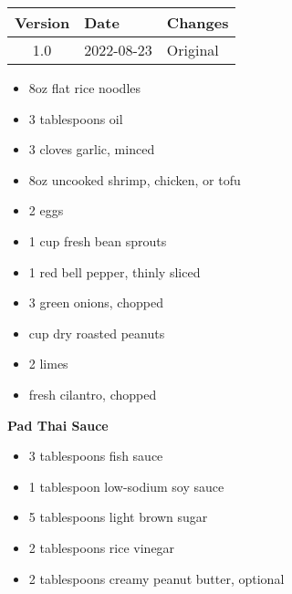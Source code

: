 \vfill

\begin{tabular}{ c | l | l }
  \textbf{Version} & \textbf{Date} & \textbf{Changes} \\ 
  \hline		
  1.0 & 2022-08-23 & Original \\
\end{tabular}



\ingredients
\begin{multicols}{2}
\raggedcolumns 
\begin{itemize}
    \item 8oz flat rice noodles
    \item 3 tablespoons oil
    \item 3 cloves garlic, minced
    \item 8oz uncooked shrimp, chicken, or tofu
    \item 2 eggs
    \item 1 cup fresh bean sprouts
    \item 1 red bell pepper, thinly sliced
    \item 3 green onions, chopped
\columnbreak
    \item {} cup dry roasted peanuts
    \item 2 limes
    \item {} fresh cilantro, chopped
\end{itemize}


\textbf{Pad Thai Sauce}
\begin{itemize}
    \item 3 tablespoons fish sauce
    \item 1 tablespoon low-sodium soy sauce
    \item 5 tablespoons light brown sugar
    \item 2 tablespoons rice vinegar
    \item 2 tablespoons creamy peanut butter, optional
\end{itemize}
\end{multicols}
\instructions
